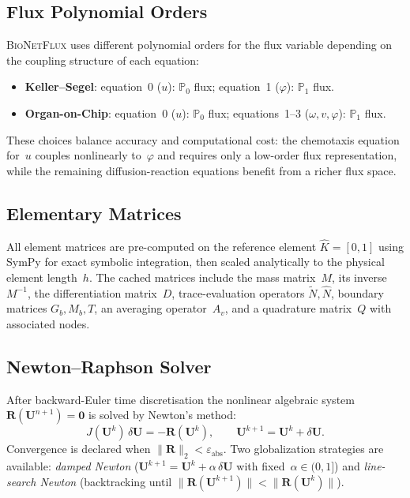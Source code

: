 \documentclass[11pt,a4paper]{article}
\newcommand{\bionetflux}{\textsc{BioNetFlux}}
\newcommand{\norm}[1]{\lVert #1 \rVert}
\begin{document}
\subsection{Flux Polynomial Orders}

\bionetflux{} uses different polynomial orders for the flux variable
depending on the coupling structure of each equation:
\begin{itemize}
  \item \textbf{Keller--Segel}: equation~0 ($u$): $\mathbb{P}_0$
        flux; equation~1 ($\varphi$): $\mathbb{P}_1$ flux.
  \item \textbf{Organ-on-Chip}: equation~0 ($u$): $\mathbb{P}_0$
        flux; equations~1--3 ($\omega,v,\varphi$): $\mathbb{P}_1$
        flux.
\end{itemize}
These choices balance accuracy and computational cost: the
chemotaxis equation for~$u$ couples nonlinearly to~$\varphi$ and
requires only a low-order flux representation, while the remaining
diffusion-reaction equations benefit from a richer flux space.

\subsection{Elementary Matrices}

All element matrices are pre-computed on the reference element
$\hat K=[0,1]$ using SymPy for exact symbolic integration, then
scaled analytically to the physical element length~$h$.  The cached
matrices include the mass matrix~$M$, its inverse~$M^{-1}$, the
differentiation matrix~$D$, trace-evaluation operators
$\widetilde N,\hat N$, boundary matrices $G_b,M_b,T$, an
averaging operator~$A_v$, and a quadrature matrix~$Q$ with
associated nodes.

\subsection{Newton--Raphson Solver}

After backward-Euler time discretisation the nonlinear algebraic
system
$\bm R(\bm U^{n+1})=\bm 0$
is solved by Newton's method:
\begin{equation}
  J(\bm U^k)\,\delta\bm U = -\bm R(\bm U^k),
  \qquad
  \bm U^{k+1}=\bm U^k+\delta\bm U.
\end{equation}
Convergence is declared when
$\norm{\bm R}_2<\varepsilon_{\text{abs}}$.
Two globalization strategies are available:
\emph{damped Newton} ($\bm U^{k+1}=\bm U^k+\alpha\,\delta\bm U$
with fixed~$\alpha\in(0,1]$) and
\emph{line-search Newton} (backtracking until
$\norm{\bm R(\bm U^{k+1})}<\norm{\bm R(\bm U^k)}$).
\end{document}
